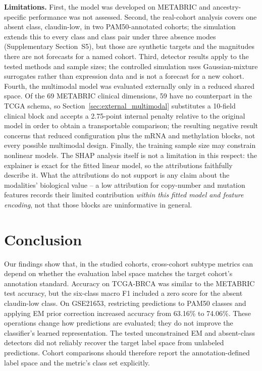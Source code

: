 \documentclass[10pt,journal,compsoc,twocolumn]{IEEEtran}
\begin{document}
\textbf{Limitations.} First, the model was developed on METABRIC and ancestry-specific performance was not assessed. Second, the real-cohort analysis covers one absent class, claudin-low, in two PAM50-annotated cohorts; the simulation extends this to every class and class pair under three absence modes (Supplementary Section~S5), but those are synthetic targets and the magnitudes there are not forecasts for a named cohort. Third, detector results apply to the tested methods and sample sizes; the controlled simulation uses Gaussian-mixture surrogates rather than expression data and is not a forecast for a new cohort. Fourth, the multimodal model was evaluated externally only in a reduced shared space. Of the 69 METABRIC clinical dimensions, 59 have no counterpart in the TCGA schema, so Section~\ref{sec:external_multimodal} substitutes a 10-field clinical block and accepts a 2.75-point internal penalty relative to the original model in order to obtain a transportable comparison; the resulting negative result concerns that reduced configuration plus the mRNA and methylation blocks, not every possible multimodal design. Finally, the training sample size may constrain nonlinear models. The SHAP analysis itself is not a limitation in this respect: the explainer is exact for the fitted linear model, so the attributions faithfully describe it. What the attributions do not support is any claim about the modalities' biological value -- a low attribution for copy-number and mutation features records their limited contribution \emph{within this fitted model and feature encoding}, not that those blocks are uninformative in general.

\section{Conclusion}

Our findings show that, in the studied cohorts, cross-cohort subtype metrics can depend on whether the evaluation label space matches the target cohort's annotation standard. Accuracy on TCGA-BRCA was similar to the METABRIC test accuracy, but the six-class macro F1 included a zero score for the absent claudin-low class. On GSE21653, restricting predictions to PAM50 classes and applying EM prior correction increased accuracy from 63.16\% to 74.06\%. These operations change how predictions are evaluated; they do not improve the classifier's learned representation. The tested unconstrained EM and absent-class detectors did not reliably recover the target label space from unlabeled predictions. Cohort comparisons should therefore report the annotation-defined label space and the metric's class set explicitly.
\end{document}
